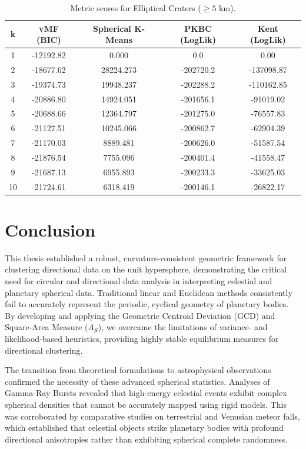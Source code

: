 \documentclass[12pt,a4paper]{report}
\begin{document}
\begin{table}[H]
\centering
\caption{Metric scores for Elliptical Craters ($\ge 5$ km).}
\label{tab:elli_5km}
\begin{tabular}{@{}ccccc@{}}
\toprule
\textbf{k} & \textbf{vMF (BIC)} & \textbf{Spherical K-Means} & \textbf{PKBC (LogLik)} & \textbf{Kent (LogLik)} \\ \midrule
1 & -12192.82 & 0.000 & 0.0 & 0.00 \\
2 & -18677.62 & 28224.273 & -202720.2 & -137098.87 \\
3 & -19374.73 & 19948.237 & -202288.2 & -110162.85 \\
4 & -20886.80 & 14924.051 & -201656.1 & -91019.02 \\
5 & -20688.66 & 12364.797 & -201275.0 & -76557.83 \\
6 & -21127.51 & 10245.066 & -200862.7 & -62904.39 \\
7 & -21170.03 & 8889.481 & -200626.0 & -51587.54 \\
8 & -21876.54 & 7755.096 & -200401.4 & -41558.47 \\
9 & -21687.13 & 6955.893 & -200233.3 & -33625.03 \\
10 & -21724.61 & 6318.419 & -200146.1 & -26822.17 \\ \bottomrule
\end{tabular}
\end{table}

\clearpage
\section{Conclusion}
This thesis established a robust, curvature-consistent geometric framework for clustering directional data on the unit hypersphere, demonstrating the critical need for circular and directional data analysis in interpreting celestial and planetary spherical data. Traditional linear and Euclidean methods consistently fail to accurately represent the periodic, cyclical geometry of planetary bodies. By developing and applying the Geometric Centroid Deviation (GCD) and Square-Area Measure ($A_S$), we overcame the limitations of variance- and likelihood-based heuristics, providing highly stable equilibrium measures for directional clustering.

The transition from theoretical formulations to astrophysical observations confirmed the necessity of these advanced spherical statistics. Analyses of Gamma-Ray Bursts revealed that high-energy celestial events exhibit complex spherical densities that cannot be accurately mapped using rigid models. This was corroborated by comparative studies on terrestrial and Venusian meteor falls, which established that celestial objects strike planetary bodies with profound directional anisotropies rather than exhibiting spherical complete randomness.
\end{document}
